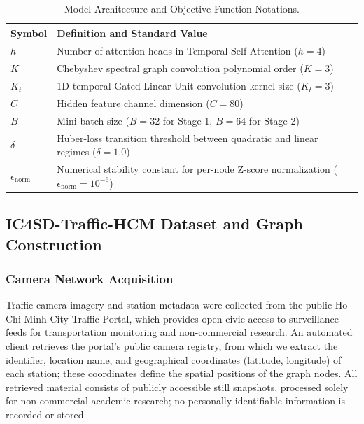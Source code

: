 \documentclass[preprint,12pt]{elsarticle}
\begin{document}
\begin{table}[htbp]
\centering
\footnotesize
\setlength{\tabcolsep}{4pt}
\renewcommand{\arraystretch}{1.1}
\caption{Model Architecture and Objective Function Notations.}
\label{tab:model_notations}
\begin{tabular}{ll}
\toprule
\textbf{Symbol} & \textbf{Definition and Standard Value} \\
\midrule
$h$ & Number of attention heads in Temporal Self-Attention ($h = 4$) \\
$K$ & Chebyshev spectral graph convolution polynomial order ($K = 3$) \\
$K_t$ & 1D temporal Gated Linear Unit convolution kernel size ($K_t = 3$) \\
$C$ & Hidden feature channel dimension ($C = 80$) \\
$B$ & Mini-batch size ($B = 32$ for Stage 1, $B = 64$ for Stage 2) \\
$\delta$ & Huber-loss transition threshold between quadratic and linear regimes ($\delta = 1.0$) \\
$\epsilon_{\mathrm{norm}}$ & Numerical stability constant for per-node Z-score normalization ($\epsilon_{\mathrm{norm}} = 10^{-6}$) \\
\bottomrule
\end{tabular}%
\end{table}


\subsection{IC4SD-Traffic-HCM Dataset and Graph Construction}
\label{sec:datasets}

\subsubsection{Camera Network Acquisition}

Traffic camera imagery and station metadata were collected from the public Ho Chi Minh City Traffic Portal, which provides open civic access to surveillance feeds for transportation monitoring and non-commercial research. An automated client retrieves the portal's public camera registry, from which we extract the identifier, location name, and geographical coordinates (latitude, longitude) of each station; these coordinates define the spatial positions of the graph nodes. All retrieved material consists of publicly accessible still snapshots, processed solely for non-commercial academic research; no personally identifiable information is recorded or stored.
\end{document}
